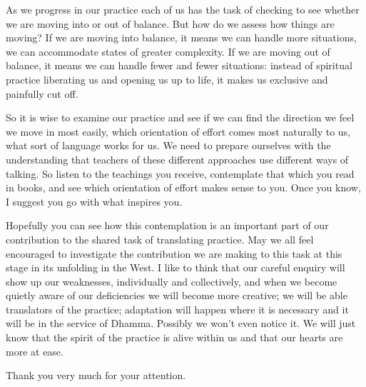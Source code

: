 As we progress in our practice each of us has the task of checking to
see whether we are moving into or out of balance. But how do we assess
how things are moving? If we are moving into balance, it means we can
handle more situations, we can accommodate states of greater complexity.
If we are moving out of balance, it means we can handle fewer and fewer
situations: instead of spiritual practice liberating us and opening us
up to life, it makes us exclusive and painfully cut off.

So it is wise to examine our practice and see if we can find the
direction we feel we move in most easily, which orientation of effort
comes most naturally to us, what sort of language works for us. We need
to prepare ourselves with the understanding that teachers of these
different approaches use different ways of talking. So listen to the
teachings you receive, contemplate that which you read in books, and see
which orientation of effort makes sense to you. Once you know, I suggest
you go with what inspires you.

\sectionBreak

Hopefully you can see how this contemplation is an important part of our
contribution to the shared task of translating practice. May we all feel
encouraged to investigate the contribution we are making to this task at
this stage in its unfolding in the West. I like to think that our careful
enquiry will show up our weaknesses, individually and collectively, and
when we become quietly aware of our deficiencies we will become more
creative; we will be able translators of the practice; adaptation will
happen where it is necessary and it will be in the service of Dhamma.
Possibly we won't even notice it. We will just know that the spirit of
the practice is alive within us and that our hearts are more at ease.

Thank you very much for your attention.

